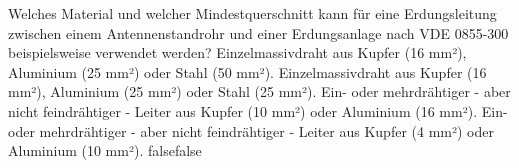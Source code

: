     {Welches Material und welcher Mindestquerschnitt kann für eine Erdungsleitung zwischen einem Antennenstandrohr und einer Erdungsanlage nach VDE 0855-300 beispielsweise verwendet werden?}
    {Einzelmassivdraht aus Kupfer (16 mm²), Aluminium (25 mm²) oder Stahl (50 mm²).}
    {Einzelmassivdraht aus Kupfer (16 mm²), Aluminium (25 mm²) oder Stahl (25 mm²).}
    {Ein- oder mehrdrähtiger - aber nicht feindrähtiger - Leiter aus Kupfer (10 mm²) oder Aluminium (16 mm²).}
    {Ein- oder mehrdrähtiger - aber nicht feindrähtiger - Leiter aus Kupfer (4 mm²) oder Aluminium (10 mm²).}
    {false}{false}